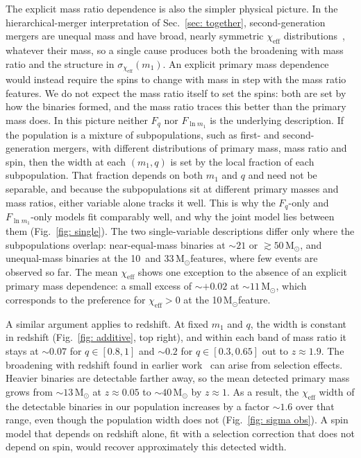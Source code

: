 \documentclass[%
 reprint,
 amsmath,amssymb,
 aps,
 prl,
 nofootinbib,nobibnotes,
]{revtex4-2}
\newcommand{\Msun}{\ensuremath{\mathrm{M}_{\odot}}}
\newcommand{\chieff}{\ensuremath{\chi_{\mathrm{eff}}}}
\newcommand{\red}[1]{{\color{Red} #1}}
\newcommand{\featTen}{10\xspace}
\newcommand{\featTwenty}{21\xspace}
\newcommand{\featThirtyFive}{33\xspace}
\begin{document}
The explicit mass ratio dependence is also the simpler physical picture. In the hierarchical-merger interpretation of Sec.~\ref{sec: together}, second-generation mergers are unequal mass and have broad, nearly symmetric $\chieff$ distributions~\cite{Vijaykumar:2026zjy}, whatever their mass, so a single cause produces both the broadening with mass ratio and the structure in $\sigma_{\chieff}(m_1)$. An explicit primary mass dependence would instead require the spins to change with mass in step with the mass ratio features. We do not expect the mass ratio itself to set the spins: both are set by how the binaries formed, and the mass ratio traces this better than the primary mass does. \red{In this picture neither $F_q$ nor $F_{\ln m_1}$ is the underlying description. If the population is a mixture of subpopulations, such as first- and second-generation mergers, with different distributions of primary mass, mass ratio and spin, then the width at each $(m_1, q)$ is set by the local fraction of each subpopulation. That fraction depends on both $m_1$ and $q$ and need not be separable, and because the subpopulations sit at different primary masses and mass ratios, either variable alone tracks it well. This is why the $F_q$-only and $F_{\ln m_1}$-only models fit comparably well, and why the joint model lies between them (Fig.~\ref{fig: single}). The two single-variable descriptions differ only where the subpopulations overlap: near-equal-mass binaries at $\sim \featTwenty$ or $\gtrsim 50\,\Msun$, and unequal-mass binaries at the \featTen\ and \featThirtyFive\,\Msun features, where few events are observed so far.} The mean $\chieff$ shows one exception to the absence of an explicit primary mass dependence: a small excess of $\sim +0.02$ at $\sim 11\,\Msun$, which corresponds to the preference for $\chieff > 0$ at the \featTen\,\Msun feature.

A similar argument applies to redshift. At fixed $m_1$ and $q$, the width is constant in redshift (Fig.~\ref{fig: additive}, top right), and within each band of mass ratio it stays at $\sim 0.07$ for $q \in [0.8, 1]$ and $\sim 0.2$ for $q \in [0.3, 0.65]$ out to $z \approx 1.9$. The broadening with redshift found in earlier work~\cite{Biscoveanu:2022qac} can arise from selection effects. Heavier binaries are detectable farther away, so the mean detected primary mass grows from $\sim 13\,\Msun$ at $z \approx 0.05$ to $\sim 40\,\Msun$ by $z \approx 1$. As a result, the $\chieff$ width of the detectable binaries in our population increases by a factor $\sim 1.6$ over that range, even though the population width does not \red{(Fig.~\ref{fig: sigma obs})}. A spin model that depends on redshift alone, fit with a selection correction that does not depend on spin, would recover approximately this detected width.
\end{document}
